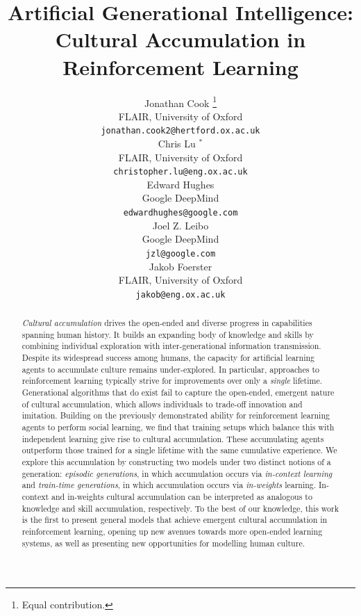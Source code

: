 \documentclass{article}
\title{Artificial Generational Intelligence: Cultural Accumulation in Reinforcement Learning}
\author{
  Jonathan Cook \thanks{Equal contribution.} \\
  FLAIR, University of Oxford\\
  \texttt{jonathan.cook2@hertford.ox.ac.uk} \\
  \And
  Chris Lu $^*$ \\
  FLAIR, University of Oxford \\
  \texttt{christopher.lu@eng.ox.ac.uk} \\
  \AND
  Edward Hughes \\
  Google DeepMind\\
  \texttt{edwardhughes@google.com} \\
  \And
  Joel Z. Leibo \\
  Google DeepMind\\
  \texttt{jzl@google.com} \\
  \And
  Jakob Foerster \\
  FLAIR, University of Oxford\\
  \texttt{jakob@eng.ox.ac.uk} \\
}
\begin{document}
\maketitle
\begin{abstract}
\textit{Cultural accumulation} drives the open-ended and diverse progress in capabilities spanning human history. It builds an expanding body of knowledge and skills by combining individual exploration with inter-generational information transmission. Despite its widespread success among humans, the capacity for artificial learning agents to accumulate culture remains under-explored. In particular, approaches to reinforcement learning typically strive for improvements over only a \textit{single} lifetime. Generational algorithms that do exist fail to capture the open-ended, emergent nature of cultural accumulation, which allows individuals to trade-off innovation and imitation. Building on the previously demonstrated ability for reinforcement learning agents to perform social learning, we find that training setups which balance this with independent learning give rise to cultural accumulation. These accumulating agents outperform those trained for a single lifetime with the same cumulative experience. We explore this accumulation by constructing two models under two distinct notions of a generation: \textit{episodic generations}, in which accumulation occurs via \textit{in-context learning} and \textit{train-time generations}, in which accumulation occurs via \textit{in-weights} learning. In-context and in-weights cultural accumulation can be interpreted as analogous to knowledge and skill accumulation, respectively. To the best of our knowledge, this work is the first to present general models that achieve emergent cultural accumulation in reinforcement learning, opening up new avenues towards more open-ended learning systems, as well as presenting new opportunities for modelling human culture.
\end{abstract}
\end{document}
